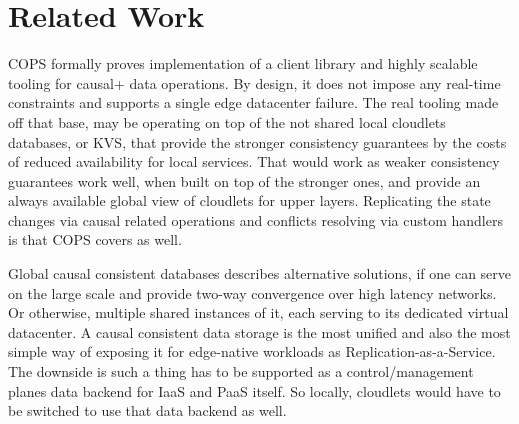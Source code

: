 \documentclass[conference]{IEEEtran}
\begin{document}
\section{Related Work}
COPS\cite{b1} formally proves implementation of a client library and highly scalable
tooling for causal+ data operations. By design, it does not impose any
real-time constraints and supports a single edge datacenter failure. The real
tooling made off that base, may be operating on top of the not shared local
cloudlets databases, or KVS, that provide the stronger consistency guarantees
by the costs of reduced availability for local services. That would work as
weaker consistency guarantees work well, when built on top of the stronger
ones, and provide an always available global view of cloudlets for upper
layers. Replicating the state changes via causal related operations and
conflicts resolving via custom handlers is that COPS covers as well.

Global causal consistent databases\cite{b6} describes alternative solutions, if
one can serve on the large scale and provide two-way convergence over high
latency networks. Or otherwise, multiple shared instances of it, each serving
to its dedicated virtual datacenter. A causal consistent data storage is the
most unified and also the most simple way of exposing it for edge-native
workloads as Replication-as-a-Service. The downside is such a thing has to be
supported as a control/management planes data backend for IaaS and PaaS itself.
So locally, cloudlets would have to be switched to use that data backend as
well.
\end{document}

